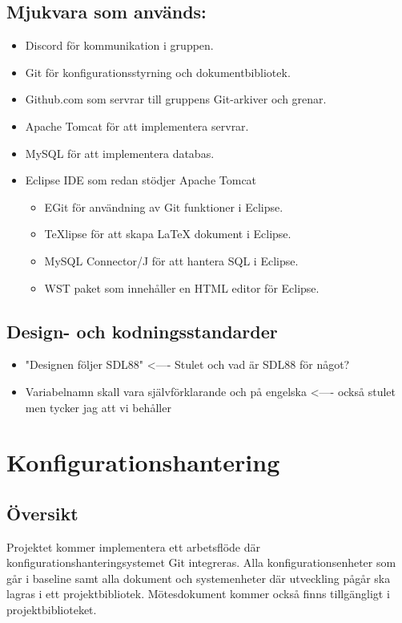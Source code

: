\documentclass[paper=a4, fontsize=11pt,twoside]{article}
\begin{document}
\subsection*{Mjukvara som används:}
	\begin{itemize}
	\item Discord för kommunikation i gruppen.
	\item Git för konfigurationsstyrning och dokumentbibliotek.
	\item Github.com som servrar till gruppens Git-arkiver och grenar.
	\item Apache Tomcat för att implementera servrar.
	\item MySQL för att implementera databas.
	\item Eclipse IDE som redan stödjer Apache Tomcat
		\begin{itemize}
		\item EGit för användning av Git funktioner i Eclipse.
		\item TeXlipse för att skapa LaTeX dokument i Eclipse.
		\item MySQL Connector/J för att hantera SQL i Eclipse.
		\item WST paket som innehåller en HTML editor för Eclipse. 
		\end{itemize}
	\end{itemize}

\subsection*{Design- och kodningsstandarder}
	\begin{itemize}
	\item "Designen följer SDL88" <---- Stulet och vad är SDL88 för något?
	\item Variabelnamn skall vara självförklarande och på engelska <---- också stulet men tycker jag att vi behåller
\end{itemize}



\section{Konfigurationshantering}
\subsection*{Översikt}
Projektet kommer implementera ett arbetsflöde där konfigurationshanteringsystemet Git integreras. Alla konfigurationsenheter som går i baseline samt alla dokument och systemenheter där utveckling pågår ska lagras i ett projektbibliotek. Mötesdokument kommer också finns tillgängligt i projektbiblioteket. 
 
\end{document}
